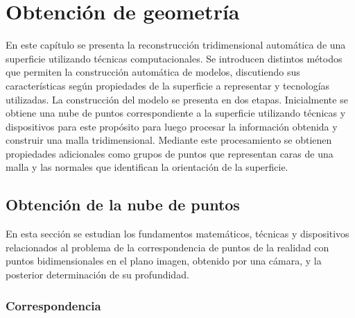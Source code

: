 \chapter{Obtención de geometría}

En este capítulo se presenta la reconstrucción tridimensional automática de una superficie utilizando técnicas computacionales.
Se introducen distintos métodos que permiten la construcción automática de modelos, discutiendo sus características según propiedades de la superficie a representar y tecnologías utilizadas.
La construcción del modelo se presenta en dos etapas. Inicialmente se obtiene una nube de puntos correspondiente a la superficie utilizando técnicas y dispositivos para este propósito para luego procesar la información obtenida y construir una malla tridimensional. Mediante este procesamiento se obtienen propiedades adicionales como grupos de puntos que representan caras de una malla y las normales que identifican la orientación de la superficie.

\section{Obtención de la nube de puntos}

En esta sección se estudian los fundamentos matemáticos, técnicas y dispositivos relacionados al problema de la correspondencia de puntos de la realidad con puntos bidimensionales en el plano imagen, obtenido por una cámara, y la posterior determinación de su profundidad. 

\subsection{Correspondencia}



